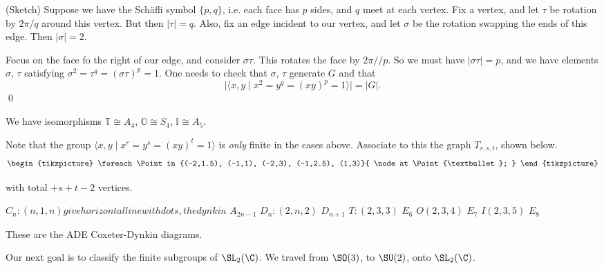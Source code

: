 \pf (Sketch) Suppose we have the Sch\"afli symbol $\{p,q\}$, i.e. each face has $p$ sides, and $q$ meet at each vertex. Fix a vertex, and let $\tau$ be rotation by $2\pi/q$ around this vertex. But then $|\tau|=q$. Also, fix an edge incident to our vertex, and let $\sigma$ be the rotation swapping the ends of this edge. Then $|\sigma|=2$. 


Focus on the face fo the right of our edge, and consider $\sigma\tau$. This rotates the face by $2\pi//p$. So we must have $|\sigma\tau|=p$, and we have elements $\sigma$, $\tau$ satisfying $\sigma^2=\tau^q=(\sigma\tau)^p=1$. One needs to check that $\sigma$, $\tau$ generate $G$ and that
	\[
	|\langle x,y \;|\; x^2=y^q=(xy)^p=1 \rangle| = |G|.
	\]
\qed \\

 
\begin{cor}
We have isomorphisms $\mathbb{T} \cong A_4$, $\mathbb{O} \cong S_4$, $\mathbb{I} \cong A_5$. 
\end{cor}

 Note that the group $\langle x,y \;|\; x^r=y^s=(xy)^t=1\rangle$ is \emph{only} finite in the cases above. Associate to this the graph $T_{r,s,t}$, shown below.
 	\[
	\begin{tikzpicture}
	\foreach \Point in {(-2,1.5), (-1,1), (-2,3), (-1,2.5), (1,3)}{
    \node at \Point {\textbullet};
}
	\end{tikzpicture}
	\]

with total $+s+t-2$ vertices. 

$C_n: (n,1,n) give horizontal line with dots, the dynkin$ $A_{2n-1}$
$D_n: (2,n,2)$  $D_{n+1}$
$T: (2,3,3)$ $E_6$
$O(2,3,4)$ $E_7$
$I(2,3,5)$ $E_8$

These are the ADE Coxeter-Dynkin diagrams. 








Our next goal is to classify the finite subgroups of $\SL_2(\C)$. We travel from $\SO(3)$, to $\SU(2)$, onto $\SL_2(\C)$. 

